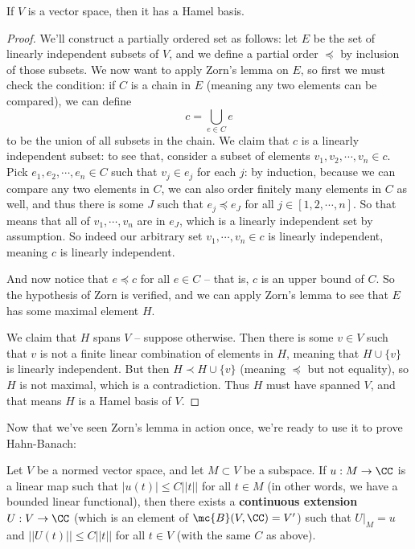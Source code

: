\begin{theorem}
If $V$ is a vector space, then it has a Hamel basis.
\end{theorem}
\begin{proof}
We'll construct a partially ordered set as follows: let $E$ be the set of linearly independent subsets of $V$, and we define a partial order $\preceq$ by inclusion of those subsets. We now want to apply Zorn's lemma on $E$, so first we must check the condition: if $C$ is a chain in $E$ (meaning any two elements can be compared), we can define 
\[
    c = \bigcup_{e \in C} e
\]
to be the union of all subsets in the chain. We claim that $c$ is a linearly independent subset: to see that, consider a subset of elements $v_1, v_2, \cdots, v_n \in c$. Pick $e_1, e_2, \cdots, e_n \in C$ such that $v_j \in e_j$ for each $j$: by induction, because we can compare any two elements in $C$, we can also order finitely many elements in $C$ as well, and thus there is some $J$ such that $e_j \preceq e_J$ for all $j \in [1, 2, \cdots, n]$. So that means that all of $v_1, \cdots, v_n$ are in $e_J$, which is a linearly independent set by assumption. So indeed our arbitrary set $v_1, \cdots, v_n \in c$ is linearly independent, meaning $c$ is linearly independent.

And now notice that $e \preceq c$ for all $e \in C$ -- that is, $c$ is an upper bound of $C$. So the hypothesis of Zorn is verified, and we can apply Zorn's lemma to see that $E$ has some maximal element $H$.

We claim that $H$ spans $V$ -- suppose otherwise. Then there is some $v \in V$ such that $v$ is not a finite linear combination of elements in $H$, meaning that $H \cup \{v\}$ is linearly independent. But then $H \prec H \cup\{v\}$ (meaning $\preceq$ but not equality), so $H$ is not maximal, which is a contradiction. Thus $H$ must have spanned $V$, and that means $H$ is a Hamel basis of $V$. 
\end{proof}

Now that we've seen Zorn's lemma in action once, we're ready to use it to prove Hahn-Banach:

\begin{theorem}\label{hahn-banach}
Let $V$ be a normed vector space, and let $M \subset V$ be a subspace. If $u: M \to \CC$ is a linear map such that $|u(t)| \le C||t||$ for all $t \in M$ (in other words, we have a bounded linear functional), then there exists a \textbf{continuous extension} $U: V \to \CC$ (which is an element of $\mc{B}(V, \CC) = V'$) such that $U|_M = u$ and $||U(t)|| \le C||t||$ for all $t \in V$ (with the same $C$ as above). 
\end{theorem}

